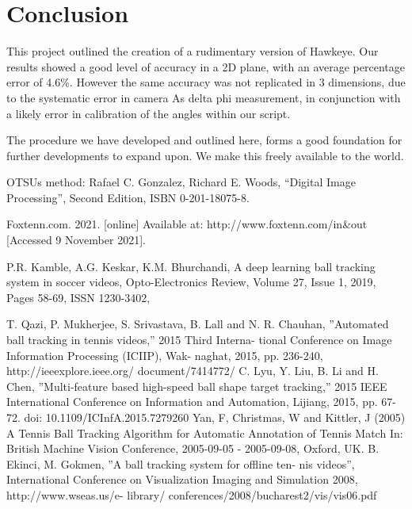 \documentclass{article}
\begin{document}
\section{Conclusion}
This project outlined the creation of a rudimentary version of Hawkeye. Our results showed a good level of accuracy in a 2D plane, with an average percentage error of 4.6\%. However the same accuracy was not replicated in 3 dimensions, due to the systematic error in camera As delta phi measurement, in conjunction with a likely error in calibration of the angles within our script. 

The procedure we have developed and outlined here, forms a good foundation for further developments to expand upon. We make this freely available to the world. 



\begin{thebibliography}{9}
OTSUs method: Rafael C. Gonzalez, Richard E. Woods, “Digital Image Processing”, Second Edition, ISBN 0-201-18075-8.

Foxtenn.com. 2021. [online] Available at: http://www.foxtenn.com/in\&out [Accessed 9 November 2021].

P.R. Kamble, A.G. Keskar, K.M. Bhurchandi,
A deep learning ball tracking system in soccer videos,
Opto-Electronics Review,
Volume 27, Issue 1,
2019,
Pages 58-69,
ISSN 1230-3402,



T. Qazi, P. Mukherjee, S. Srivastava, B. Lall and N. R. Chauhan, ”Automated ball tracking in tennis videos,” 2015 Third Interna- tional Conference on Image Information Processing (ICIIP), Wak- naghat, 2015, pp. 236-240, http://ieeexplore.ieee.org/ document/7414772/
C. Lyu, Y. Liu, B. Li and H. Chen, ”Multi-feature based high-speed ball shape target tracking,” 2015 IEEE International Conference on Information and Automation, Lijiang, 2015, pp. 67-72. doi: 10.1109/ICInfA.2015.7279260
Yan, F, Christmas, W and Kittler, J (2005) A Tennis Ball Tracking Algorithm for Automatic Annotation of Tennis Match In: British Machine Vision Conference, 2005-09-05 - 2005-09-08, Oxford, UK.
B. Ekinci, M. Gokmen, ”A ball tracking system for offline ten- nis videos”, International Conference on Visualization Imaging and Simulation 2008, http://www.wseas.us/e- library/ conferences/2008/bucharest2/vis/vis06.pdf


\end{thebibliography}
\end{document}

